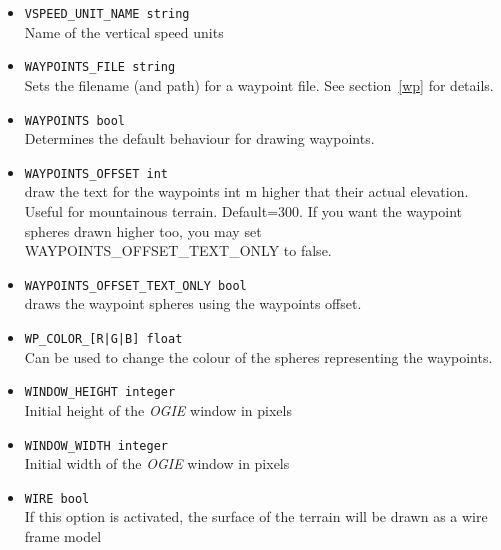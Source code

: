 \begin{itemize}
\item \texttt{VSPEED\_UNIT\_NAME string} \\
Name of the vertical speed units

\item \texttt{WAYPOINTS\_FILE string} \\
Sets the filename (and path) for a waypoint file. See section~\ref{wp} for details.

\item \texttt{WAYPOINTS bool} \\
Determines the default behaviour for drawing waypoints.

\item \texttt{WAYPOINTS\_OFFSET int} \\
draw the text for the waypoints int m higher that their actual elevation. Useful for mountainous terrain. Default=300. If you want the waypoint spheres drawn higher too, you may set WAYPOINTS\_OFFSET\_TEXT\_ONLY to false.

\item \texttt{WAYPOINTS\_OFFSET\_TEXT\_ONLY bool} \\
draws the waypoint spheres using the waypoints offset.

\item \texttt{WP\_COLOR\_[R|G|B] float} \\
Can be used to change the colour of the spheres representing the waypoints.

\item \texttt{WINDOW\_HEIGHT integer} \\
Initial height of the \emph{OGIE} window in pixels

\item \texttt{WINDOW\_WIDTH integer} \\
Initial width of the \emph{OGIE} window in pixels

\item \texttt{WIRE bool} \\
If this option is activated, the surface of the terrain will be drawn as a wire frame model

\end{itemize}

